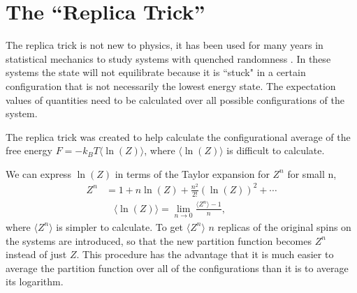 %
%
%
%

\section{The ``Replica Trick''}

The replica trick is not new to physics, it has been used for many years in statistical mechanics to study systems with quenched randomness \cite{dad}.
In these systems the state will not equilibrate because it is ``stuck" in a certain configuration that is not necessarily the lowest energy state. 
The expectation values of quantities need to be calculated over all possible configurations of the system.

The replica trick was created to help calculate the configurational average of the free energy $F = -k_B T \langle\ln(Z) \rangle $, where $\langle\ln(Z) \rangle $ is difficult to calculate.

We can express  $ \ln(Z) $ in terms of the Taylor expansion for $Z^n$ for small n,
\begin{align}
	Z^n &= 1+ n\ln(Z) + \frac{n^2}{2!}\left( \ln (Z)\right)^2 + \cdots \\
	&\;\;\; \langle \ln(Z) \rangle = \lim_{n\to0} \frac {\langle Z^n\rangle -1}{n},
\end{align} 
where $\langle Z^n \rangle$ is simpler to calculate.
To get  $\langle Z^n \rangle$ $n$ replicas of the original spins on the systems are introduced, so that the new partition function becomes $Z^n$ instead of just $Z$.
This procedure has the advantage that it is much easier to average the partition function over all of the configurations than it is to average its logarithm.

